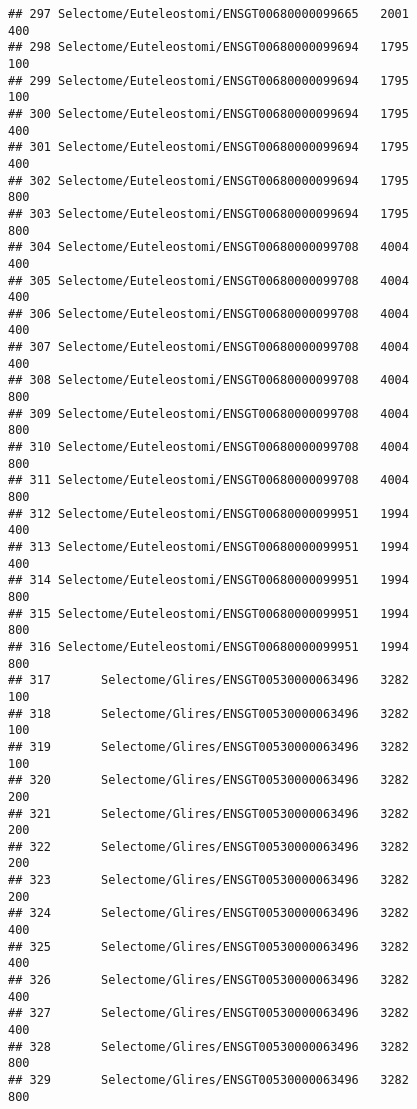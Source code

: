 \documentclass[
]{article}
\begin{document}
\begin{verbatim}
## 297 Selectome/Euteleostomi/ENSGT00680000099665   2001                   400
## 298 Selectome/Euteleostomi/ENSGT00680000099694   1795                   100
## 299 Selectome/Euteleostomi/ENSGT00680000099694   1795                   100
## 300 Selectome/Euteleostomi/ENSGT00680000099694   1795                   400
## 301 Selectome/Euteleostomi/ENSGT00680000099694   1795                   400
## 302 Selectome/Euteleostomi/ENSGT00680000099694   1795                   800
## 303 Selectome/Euteleostomi/ENSGT00680000099694   1795                   800
## 304 Selectome/Euteleostomi/ENSGT00680000099708   4004                   400
## 305 Selectome/Euteleostomi/ENSGT00680000099708   4004                   400
## 306 Selectome/Euteleostomi/ENSGT00680000099708   4004                   400
## 307 Selectome/Euteleostomi/ENSGT00680000099708   4004                   400
## 308 Selectome/Euteleostomi/ENSGT00680000099708   4004                   800
## 309 Selectome/Euteleostomi/ENSGT00680000099708   4004                   800
## 310 Selectome/Euteleostomi/ENSGT00680000099708   4004                   800
## 311 Selectome/Euteleostomi/ENSGT00680000099708   4004                   800
## 312 Selectome/Euteleostomi/ENSGT00680000099951   1994                   400
## 313 Selectome/Euteleostomi/ENSGT00680000099951   1994                   400
## 314 Selectome/Euteleostomi/ENSGT00680000099951   1994                   800
## 315 Selectome/Euteleostomi/ENSGT00680000099951   1994                   800
## 316 Selectome/Euteleostomi/ENSGT00680000099951   1994                   800
## 317       Selectome/Glires/ENSGT00530000063496   3282                   100
## 318       Selectome/Glires/ENSGT00530000063496   3282                   100
## 319       Selectome/Glires/ENSGT00530000063496   3282                   100
## 320       Selectome/Glires/ENSGT00530000063496   3282                   200
## 321       Selectome/Glires/ENSGT00530000063496   3282                   200
## 322       Selectome/Glires/ENSGT00530000063496   3282                   200
## 323       Selectome/Glires/ENSGT00530000063496   3282                   200
## 324       Selectome/Glires/ENSGT00530000063496   3282                   400
## 325       Selectome/Glires/ENSGT00530000063496   3282                   400
## 326       Selectome/Glires/ENSGT00530000063496   3282                   400
## 327       Selectome/Glires/ENSGT00530000063496   3282                   400
## 328       Selectome/Glires/ENSGT00530000063496   3282                   800
## 329       Selectome/Glires/ENSGT00530000063496   3282                   800

\end{verbatim}
\end{document}
